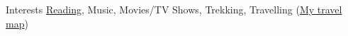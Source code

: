 \documentclass{resume}
\begin{document}

\begin{rSection}{Interests}
  \href{https://www.goodreads.com/review/list/30403080}{Reading}, Music, Movies/TV Shows, Trekking, Travelling (\href{https://www.google.com/maps/d/edit?mid=zunfqCxpiwTU.kOUFmlYs1s4o&usp=sharing}{My travel map}) \\
\end{rSection}



\end{document}
